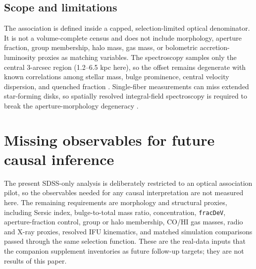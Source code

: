 \documentclass[twocolumn]{aastex631}
\begin{document}
\subsection{Scope and limitations}
The association is defined inside a capped, selection-limited optical denominator. It is not a volume-complete census and does not include morphology, aperture fraction, group membership, halo mass, gas mass, or bolometric accretion-luminosity proxies as matching variables. The spectroscopy samples only the central 3-arcsec region (1.2--6.5 kpc here), so the offset remains degenerate with known correlations among stellar mass, bulge prominence, central velocity dispersion, and quenched fraction \citep{schawinski2010,bluck2014,piotrowska2022}. Single-fiber measurements can miss extended star-forming disks, so spatially resolved integral-field spectroscopy is required to break the aperture-morphology degeneracy \citep{penny2018,cheung2016,bundy2015,canodiaz2016}.

\section{Missing observables for future causal inference}
The present SDSS-only analysis is deliberately restricted to an optical association pilot, so the observables needed for any causal interpretation are not measured here. The remaining requirements are morphology and structural proxies, including Sersic index, bulge-to-total mass ratio, concentration, \texttt{fracDeV}, aperture-fraction control, group or halo membership, CO/HI gas masses, radio and X-ray proxies, resolved IFU kinematics, and matched simulation comparisons passed through the same selection function. These are the real-data inputs that the companion supplement inventories as future follow-up targets; they are not results of this paper.
\end{document}
